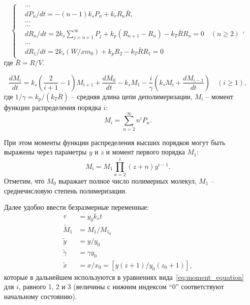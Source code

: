 \documentclass[12pt, letterpaper]{article}
\begin{document}
\begin{equation} \label{eq:Boyd_system_3}
	\left\{
	\begin{aligned}
		&\dots \\
		&d P_n / d t=-(n-1) k_s P_n+k_r R_n \bar{R}, \\
		&\dots \\
		&\dots \\
		&d R_n / d t=2 k_s \sum_{j=n+1}^{\infty} P_j+k_p(R_{n+1}-R_n)-k_T \bar{R} R_n=0 \quad(n \geq 2) \\
		&\dots \\
		&d R_1 / d t=2 k_s(W / x m_0)+k_p R_2-k_T \bar{R} R_1=0
	\end{aligned}
	\right.,
\end{equation}
где $\bar{R} = R/V$.

\begin{equation} \label{eq:moment_equation}
	\frac{d M_i}{d t}=k_s(\frac{2}{i+1}-1) M_{i+1}+\frac{d M_0}{d t}-k_s M_1 - \frac{i}{\gamma}(k_s M_i+\frac{d M_{i-1}}{d t}) \quad(i \geq 1),
\end{equation}
где $1/\gamma = k_p / (k_T \bar{R})$ -- средняя длина цепи деполимеризации, $M_i$ -- момент функции распределения порядка $i$:
\begin{equation}
	M_i=\sum_{n=2}^{\infty} n^i P_n.
\end{equation}

При этом моменты функции распределения высших порядков могут быть выражены через параметры $y$ и $z$ и момент первого порядка $M_1$:
\begin{equation}
	M_i=M_1 \prod_{n=2}^i(z+n) y^{i-1}.
\end{equation}
Отметим, что $M_0$ выражает полное число полимерных молекул, $M_1$ -- среднечисловую степень полимеризации.

Далее удобно ввести безразмерные переменные:
\begin{equation} \label{eq:dim_less_MW}
	\begin{aligned}
		\tau & = y_0 k_s t \\
		\tilde{M}_1 & = M_1 / M_{1_0} \\
		\tilde{y} & = y / y_0 \\
		\tilde{\gamma} & = \gamma y_0 \\
		\tilde{x} & = x / x_0 = \left[y(z+1) / y_0(z_0+1)\right],
	\end{aligned}
\end{equation}
которые в дальнейшем используются в уравнениях вида~\ref{eq:moment_equation} для $i$, равного 1, 2 и 3 (величины с нижним индексом ``0'' соответствуют начальному состоянию).
\end{document}

